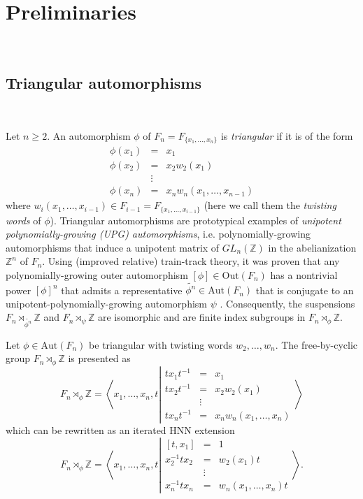 \documentclass  [a4paper, 11pts] {article}
\newcommand{\Z}{\mathbb{Z}}
\newcommand{\Out}{{\mathrm{Out}}}
\newcommand{\Aut}{{\mathrm{Aut}}}
\begin{document}
\section{Preliminaries} ~
\label{Prel}

\subsection{Triangular automorphisms} ~
\label{UPG}

Let $n\ge 2$. An automorphism $\phi$ of $F_n = F_{\{x_1,\ldots,x_n\}}$ is \emph{triangular} if it is of the form
\[\begin{array}{lcl}
    \phi(x_1) & = & x_1 \\
    \phi(x_2) & = & x_2 w_2(x_1) \\
    & \vdots & \\
    \phi(x_n) & = & x_n w_n(x_1,\ldots,x_{n-1})
\end{array}\]
where $w_i(x_1,\ldots,x_{i-1})\in F_{i-1} = F_{\{x_1,\ldots,x_{i-1}\}}$ (here we call them the \emph{twisting words} of $\phi$). Triangular automorphisms are prototypical examples of \emph{unipotent polynomially-growing (UPG) automorphisms}, i.e. polynomially-growing automorphisms that induce a unipotent matrix of $GL_n(\Z)$ in the abelianization $\Z^n$ of $F_n$. Using (improved relative) train-track theory, it was proven that any polynomially-growing outer automorphism $[\phi]\in \Out(F_n)$ has a nontrivial power $[\phi]^n$ that admits a representative $\widetilde{\phi^n}\in \Aut(F_n)$ that is conjugate to an unipotent-polynomially-growing automorphism $\psi$ \cite{BFH00}. Consequently, the suspensions $F_n\rtimes_{\widetilde{\phi^n}}\Z$ and $F_n\rtimes_{\psi}\Z$ are isomorphic and are finite index subgroups in $F_n\rtimes_\phi \Z$.

Let $\phi\in \Aut(F_n)$ be triangular with twisting words $w_2,\ldots, w_n$. The free-by-cyclic group $F_n\rtimes_\phi\Z$ is presented as
\[F_n\rtimes_\phi \Z = \left\langle x_1,\ldots,x_n, t \left| \begin{array}{rcl}
tx_1t^{-1} & = & x_1 \\
tx_2t^{-1} & = & x_2w_2(x_1) \\
& \vdots & \\
tx_nt^{-1} & = & x_nw_n(x_1,\ldots,x_n)
\end{array}\right .\right\rangle\]
which can be rewritten as an iterated HNN extension
\[F_n\rtimes_\phi \Z = \left\langle x_1,\ldots,x_n, t \left| \begin{array}{rcl}
[t, x_1] & = & 1 \\
x_2^{-1}tx_2 & = & w_2(x_1)t \\
& \vdots & \\
x_n^{-1}tx_n & = & w_n(x_1,\ldots,x_n)t
\end{array}\right .\right\rangle.\]
\end{document}
